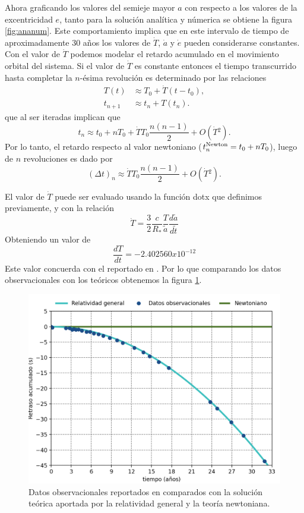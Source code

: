 Ahora graficando los valores del semieje mayor $a$ con respecto a los valores de la excentricidad $e$, tanto para la solución analítica y númerica se obtiene la figura
\ref{fig:ananum}. Este comportamiento implica que en este intervalo de tiempo de aproximadamente 30 años los 
valores de $\dot{T}$, $\dot{a}$ y $\dot{e}$ pueden considerarse constantes. Con el valor de $\dot{T}$ 
podemos modelar el retardo acumulado en el movimiento orbital del sistema. Si el valor de $\dot{T}$ es constante
entonces el tiempo transcurrido hasta completar la $n$-ésima revolución es determinado por las relaciones
\begin{align*}
T(t)&\approx T_0 + \dot{T}(t-t_0),\\
t_{n+1}& \approx t_n + T(t_n).
\end{align*}
que al ser iteradas implican que
\begin{equation*}
t_n \approx t_0+nT_0+\dot{T}T_0\frac{n(n-1)}{2}+O(\dot{T}{}^2).
\end{equation*}
Por lo tanto, el retardo respecto al valor newtoniano ($t_n^{\rm Newton}=t_0+nT_0$), luego de $n$ revoluciones es dado por
\begin{equation*}
(\Delta t)_n \approx \dot{T}T_0\frac{n(n-1)}{2}+O(\dot{T}{}^2).
\end{equation*}

El valor de $\dot{T}$ puede ser evaluado usando la función \textcolor{def}{dotx} que definimos previamente, y con la relación
\begin{equation*}
\dot{T}=\frac{3}{2}\frac{c}{R_\ast}\frac{T}{\tilde{a}}\frac{d\tilde{a}}{d\tilde{t}}
\end{equation*}
Obteniendo un valor de 
\begin{equation*}
    \frac{dT}{dt}=-2.402560x10^{-12}
\end{equation*}
Este valor concuerda con el reportado en \cite{Weisberg2010}. Por lo que comparando los datos observacionales con los teóricos obtenemos la figura \ref{fig:exp}.
\begin{figure}[H]
    \centering
    \includegraphics[scale=0.70]{images/exp.png}
    \caption{Datos observacionales reportados en \cite{Weisberg2010} comparados con la solución teórica aportada por la relatividad general y la teoría newtoniana.}
    \label{fig:exp}
\end{figure}